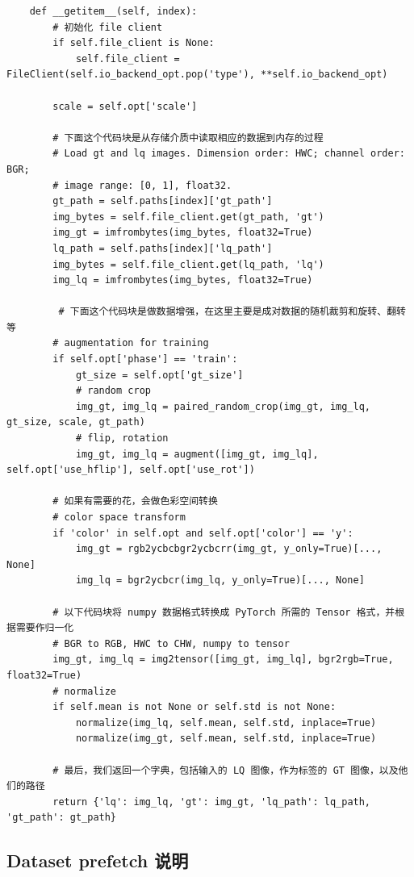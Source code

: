 \documentclass[../main.tex]{subfiles}
\begin{document}
\begin{verbatim}
    def __getitem__(self, index):
        # 初始化 file client
        if self.file_client is None:
            self.file_client = FileClient(self.io_backend_opt.pop('type'), **self.io_backend_opt)

        scale = self.opt['scale']

        # 下面这个代码块是从存储介质中读取相应的数据到内存的过程
        # Load gt and lq images. Dimension order: HWC; channel order: BGR;
        # image range: [0, 1], float32.
        gt_path = self.paths[index]['gt_path']
        img_bytes = self.file_client.get(gt_path, 'gt')
        img_gt = imfrombytes(img_bytes, float32=True)
        lq_path = self.paths[index]['lq_path']
        img_bytes = self.file_client.get(lq_path, 'lq')
        img_lq = imfrombytes(img_bytes, float32=True)

         # 下面这个代码块是做数据增强，在这里主要是成对数据的随机裁剪和旋转、翻转等
        # augmentation for training
        if self.opt['phase'] == 'train':
            gt_size = self.opt['gt_size']
            # random crop
            img_gt, img_lq = paired_random_crop(img_gt, img_lq, gt_size, scale, gt_path)
            # flip, rotation
            img_gt, img_lq = augment([img_gt, img_lq], self.opt['use_hflip'], self.opt['use_rot'])

        # 如果有需要的花，会做色彩空间转换
        # color space transform
        if 'color' in self.opt and self.opt['color'] == 'y':
            img_gt = rgb2ycbcbgr2ycbcrr(img_gt, y_only=True)[..., None]
            img_lq = bgr2ycbcr(img_lq, y_only=True)[..., None]

        # 以下代码块将 numpy 数据格式转换成 PyTorch 所需的 Tensor 格式，并根据需要作归一化
        # BGR to RGB, HWC to CHW, numpy to tensor
        img_gt, img_lq = img2tensor([img_gt, img_lq], bgr2rgb=True, float32=True)
        # normalize
        if self.mean is not None or self.std is not None:
            normalize(img_lq, self.mean, self.std, inplace=True)
            normalize(img_gt, self.mean, self.std, inplace=True)

        # 最后，我们返回一个字典，包括输入的 LQ 图像，作为标签的 GT 图像，以及他们的路径
        return {'lq': img_lq, 'gt': img_gt, 'lq_path': lq_path, 'gt_path': gt_path}
    \end{verbatim}

\subsection{Dataset prefetch 说明}\label{code_structure:dataset_prefecth}
\end{document}
